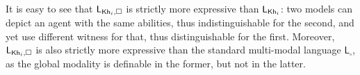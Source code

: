 It is easy to see that $\mathsf{L}_{{\sf Kh}_i,\square}$ is strictly more expressive than $\mathsf{L}_{{\sf Kh}_i}$: two models can depict an agent with the same abilities, thus indistinguishable for the second, and yet use different witness for that, thus distinguishable for the first. 
Moreover, $\mathsf{L}_{{\sf Kh}_i,\square}$ is also strictly more expressive than the standard multi-modal language $\mathsf{L}_{\square}$, as the global modality is definable in the former, but not in the latter.

\medskip
